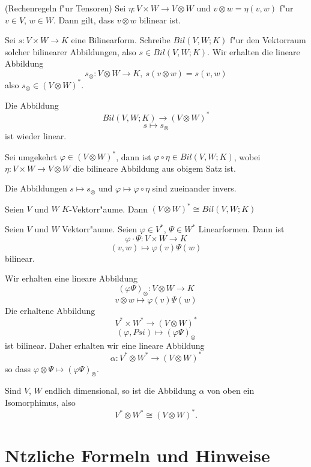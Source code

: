 \documentclass[11pt, a4paper]{article}
\begin{document}
\begin{remark} (Rechenregeln f"ur Tensoren)
Sei $\eta: V \times W \rightarrow V \otimes W$ und $v \otimes w = \eta(v,w)$ f"ur $v \in V$, $w \in W$. Dann gilt, dass $v \otimes w$ bilinear ist.
\end{remark}

\begin{example}
Sei $s : V \times W \rightarrow K$ eine Bilinearform. Schreibe $Bil(V, W; K)$ f"ur den Vektorraum solcher bilinearer Abbildungen, also $s \in Bil(V, W; K)$.
Wir erhalten die lineare Abbildung 
$$
s_\otimes: V \otimes W \rightarrow K, \ s(v \otimes w) = s(v, w)
$$
also $s_\otimes \in (V \otimes W)^*$. 

Die Abbildung 
$$
Bil(V, W; K) \rightarrow (V \otimes W)^*
$$
$$
s \mapsto s_\otimes
$$
ist wieder linear.

Sei umgekehrt $\varphi \in (V \otimes W)^*$, dann ist $\varphi \circ \eta \in Bil(V, W; K)$, wobei $\eta: V \times W \rightarrow V \otimes W$ die bilineare Abbildung aus obigem Satz ist.

Die Abbildungen $s \mapsto s_\otimes$ und $ \varphi \mapsto \varphi \circ \eta $
sind zueinander invers.
\end{example}

\begin{theorem}
Seien $V$ und $W$ $K$-Vektorr"aume. Dann $(V \otimes W)^* \cong Bil(V, W; K)$
\end{theorem}

\begin{example}
Seien $V$ und $W$ Vektorr"aume.
Seien $\varphi \in V^*$, $\Psi \in W^*$ Linearformen.
Dann ist 
$$
\varphi \cdot \Psi: V \times W \rightarrow K
$$
$$
(v, w) \mapsto \varphi (v) \Psi(w)
$$
bilinear.

Wir erhalten eine lineare Abbildung
$$
(\varphi \Psi)_\otimes : V \otimes W \rightarrow K
$$
$$
v \otimes w \mapsto \varphi (v) \Psi(w)
$$
Die erhaltene Abbildung
$$
V^* \times W^* \rightarrow (V \otimes W)^*
$$
$$
(\varphi, Psi) \mapsto (\varphi \Psi)_\otimes
$$
ist bilinear.
Daher erhalten wir eine lineare Abbildung
$$
\alpha: V^* \otimes W^* \rightarrow (V \otimes W)^*
$$
so dass $\varphi \otimes \Psi \mapsto (\varphi \Psi)_\otimes$.

\end{example}

\begin{theorem}
Sind $V$, $W$ endlich dimensional, so ist die Abbildung $\alpha$ von oben ein Isomorphimus, also 
$$
V^* \otimes W^* \cong (V \otimes W)^*.
$$
\end{theorem}



 
\section{N\uee tzliche Formeln und Hinweise}
\end{document}
